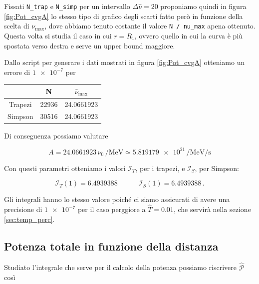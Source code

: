 \documentclass[a4paper, titlepage]{article}
\begin{document}
Fissati \texttt{N\_trap} e \texttt{N\_simp} per un intervallo $\Delta \hat \nu = 20$ proponiamo quindi in figura \ref{fig:Pot_cvgA} lo stesso tipo di grafico degli scarti fatto però in funzione della scelta di $\nu_\text{max}$, dove abbiamo tenuto costante il valore \texttt{N / nu\_max} apena ottenuto.
Questa volta si studia il caso in cui $r = R_1$, ovvero quello in cui la curva è più spostata verso destra e serve un upper bound maggiore.

Dallo script per generare i dati mostrati in figura \ref{fig:Pot_cvgA} otteniamo un errore di $\num{1e-7}$ per

\begin{table}[h]
    \centering
    \begin{tabular}{ccc}
         & N & $\hat \nu_\text{max}$ \\
        \hline
        Trapezi & 22936 & 24.0661923 \\
        \hline
        Simpson & 30516 & 24.0661923 \\
    \end{tabular}
\end{table}

Di conseguenza possiamo valutare

\begin{equation}
    A = 24.0661923 \, \nu_0 \, \unit{\per\mega\electronvolt} \simeq \num{5.819179e21} \, \unit{\per\mega\electronvolt\per\second}
    \label{eq:A_giusto}
\end{equation}

Con questi parametri otteniamo i valori $\mathcal I_T$, per i trapezi, e $\mathcal I_S$, per Simpson:

\begin{equation}
    \mathcal I_T (1) = 6.4939388
    \quad \quad \quad
    \mathcal I_S (1) = 6.4939388 \, .
    \label{eq:val_I}
\end{equation}

Gli integrali hanno lo stesso valore poiché ci siamo assicurati di avere una
precisione di $\num{1e-7}$ per il caso perggiore a $\hat T = 0.01$, che servirà
nella sezione \ref{sec:temp_perc}.


\subsection{Potenza totale in funzione della distanza}

Studiato l'integrale che serve per il calcolo della potenza possiamo riscrivere $\mathcal{\hat P}$ così
\end{document}
